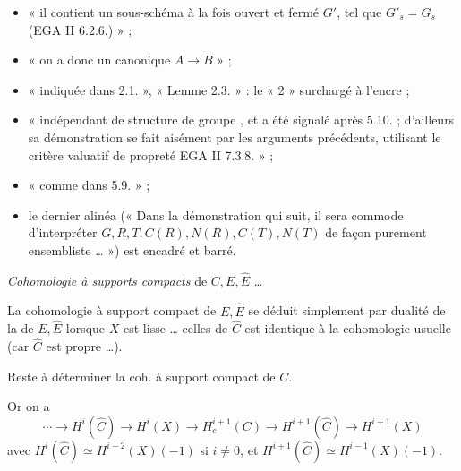\documentclass[11pt,a4paper]{article}
\begin{document}


\begin{itemize}
  \item « il contient un sous-schéma à la fois ouvert et fermé $G'$,
   tel que $G'_s = G_s$ (EGA II 6.2.6.) » ;
  \item « on a donc un  \struck{\ill{}} canonique
  $A \to B$ » ;
  \item « indiquée dans 2.1. », « Lemme 2.3. » : le « 2 » surchargé à l'encre ;
  \item « indépendant de \struck{\ill{}}  structure de groupe
  , et a été signalé après  5.10. ; d'ailleurs sa
  démonstration \struck{\ill{}} se fait aisément par les arguments précédents,
   utilisant le critère valuatif de propreté EGA II 7.3.8. » ;
  \item « comme dans  5.9. » ;
  \item le dernier alinéa (« Dans la démonstration qui suit, il sera commode
  d'interpréter $G, R, T, C(R), N(R), C(T), N(T)$ de façon purement
  ensembliste … ») est encadré et barré.
\end{itemize}


\emph{Cohomologie à supports compacts} \struck{\ill{}} de $C, E, \widehat{E}$ …

La cohomologie à support compact de $E, \widehat{E}$ se déduit simplement par
dualité de la  \struck{\ill{}} de $E, \widehat{E}$ lorsque $X$
est lisse … celles de $\widehat{C}$ est identique à la cohomologie usuelle (car
$\widehat{C}$ est propre …).

Reste à déterminer la coh. à support compact de $C$.

Or on a 
\[
  \cdots \to H^i(\widehat{C}) \to H^i(X) \to H^{i+1}_c(C) \to H^{i+1}(\widehat{C})
  \to H^{i+1}(X)
\]
avec $H^i(\widehat{C}) \simeq H^{i-2}(X)(-1)$ si $i \neq 0$, et
$H^{i+1}(\widehat{C}) \simeq H^{i-1}(X)(-1)$.
\end{document}
